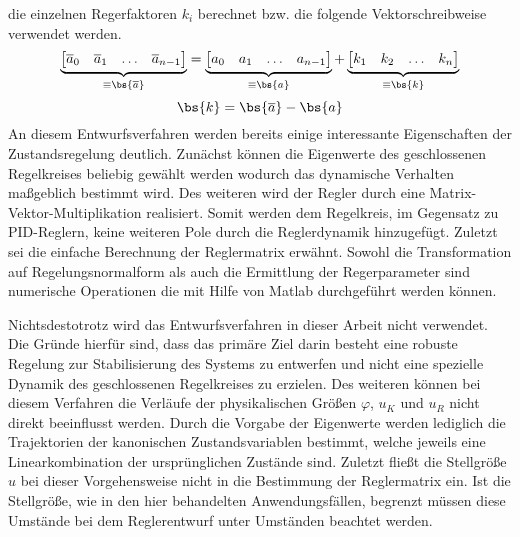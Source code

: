 die einzelnen Regerfaktoren $k_i$ berechnet bzw. die folgende Vektorschreibweise verwendet werden.
\begin{equation}
\underbrace{
\begin{bmatrix}
\overline{a}_0 & \overline{a}_1 & \hdots &\overline{a}_{n-1}
\end{bmatrix}}_{\equiv \bs{\overline{a}}}
=
\underbrace{
\begin{bmatrix}
a_0 & a_1 & \hdots & a_{n-1}
\end{bmatrix}}_{\equiv \bs{a}}
+
\underbrace{
\begin{bmatrix}
k_1 & k_2 & \hdots & k_n
\end{bmatrix}}_{\equiv \bs{k}}
\end{equation}
\begin{equation}
\bs{k} = \bs{\overline{a}} - \bs{a}
\end{equation}
An diesem Entwurfsverfahren werden bereits einige interessante Eigenschaften der Zustandsregelung deutlich. Zunächst können die Eigenwerte des geschlossenen Regelkreises beliebig gewählt werden wodurch das dynamische Verhalten maßgeblich bestimmt wird. Des weiteren wird der Regler durch eine Matrix-Vektor-Multiplikation realisiert. Somit werden dem Regelkreis, im Gegensatz zu PID-Reglern, keine weiteren Pole durch die Reglerdynamik hinzugefügt. Zuletzt sei die einfache Berechnung der Reglermatrix erwähnt. Sowohl die Transformation auf Regelungsnormalform als auch die Ermittlung der Regerparameter sind numerische Operationen die mit Hilfe von Matlab durchgeführt werden können.

Nichtsdestotrotz wird das Entwurfsverfahren in dieser Arbeit nicht verwendet. Die Gründe hierfür sind, dass das primäre Ziel darin besteht eine robuste Regelung zur Stabilisierung des Systems zu entwerfen und nicht eine spezielle Dynamik des geschlossenen Regelkreises zu erzielen. Des weiteren können bei diesem Verfahren die Verläufe der physikalischen Größen $\varphi$, $u_K$ und $u_R$ nicht direkt beeinflusst werden. Durch die Vorgabe der Eigenwerte werden lediglich die Trajektorien der kanonischen Zustandsvariablen bestimmt, welche jeweils eine Linearkombination der ursprünglichen Zustände sind. Zuletzt fließt die Stellgröße $u$ bei dieser Vorgehensweise nicht in die Bestimmung der Reglermatrix ein. Ist die Stellgröße, wie in den hier behandelten Anwendungsfällen, begrenzt müssen diese Umstände bei dem Reglerentwurf unter Umständen beachtet werden.